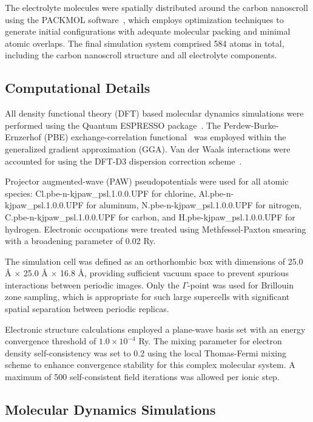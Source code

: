 The electrolyte molecules were spatially distributed around the carbon nanoscroll using the PACKMOL software~\cite{packmol}, which employs optimization techniques to generate initial configurations with adequate molecular packing and minimal atomic overlaps. The final simulation system comprised 584 atoms in total, including the carbon nanoscroll structure and all electrolyte components.

\subsection{Computational Details}

All density functional theory (DFT) based molecular dynamics simulations were performed using the Quantum ESPRESSO package~\cite{qe}. The Perdew-Burke-Ernzerhof (PBE) exchange-correlation functional~\cite{pbe} was employed within the generalized gradient approximation (GGA). Van der Waals interactions were accounted for using the DFT-D3 dispersion correction scheme~\cite{grimme}.

Projector augmented-wave (PAW) pseudopotentials were used for all atomic species: Cl.pbe-n-kjpaw\_psl.1.0.0.UPF for chlorine, Al.pbe-n-kjpaw\_psl.1.0.0.UPF for aluminum, N.pbe-n-kjpaw\_psl.1.0.0.UPF for nitrogen, C.pbe-n-kjpaw\_psl.1.0.0.UPF for carbon, and H.pbe-kjpaw\_psl.1.0.0.UPF for hydrogen. Electronic occupations were treated using Methfessel-Paxton smearing with a broadening parameter of 0.02 Ry.

The simulation cell was defined as an orthorhombic box with dimensions of 25.0 \AA{} $\times$ 25.0 \AA{} $\times$ 16.8 \AA{}, providing sufficient vacuum space to prevent spurious interactions between periodic images. Only the $\Gamma$-point was used for Brillouin zone sampling, which is appropriate for such large supercells with significant spatial separation between periodic replicas.

Electronic structure calculations employed a plane-wave basis set with an energy convergence threshold of $1.0 \times 10^{-4}$ Ry. The mixing parameter for electron density self-consistency was set to 0.2 using the local Thomas-Fermi mixing scheme to enhance convergence stability for this complex molecular system. A maximum of 500 self-consistent field iterations was allowed per ionic step.

\subsection{Molecular Dynamics Simulations}

